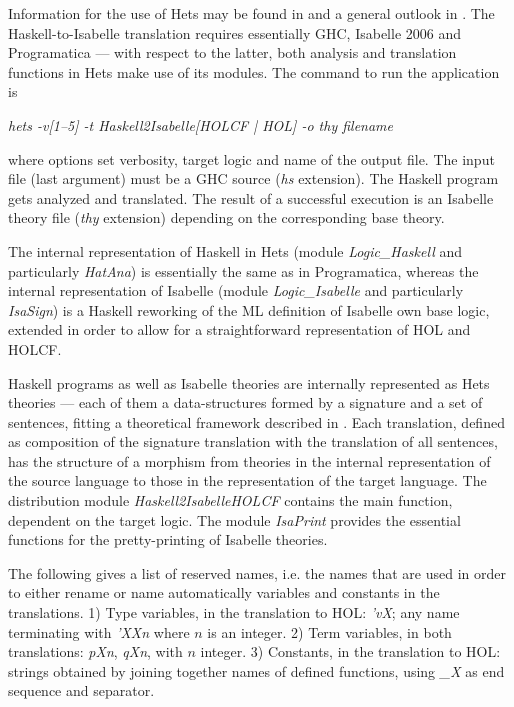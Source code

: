 \documentclass{llncs}
\begin{document}
Information for the use of Hets may be found in \cite{HetsUG} and a
general outlook in \cite{HetsUG}. The Haskell-to-Isabelle translation
requires essentially GHC, Isabelle 2006 and Programatica --- with
respect to the latter, both analysis and translation functions in Hets
make use of its modules.  The command to run the application is

\emph{hets -v[1--5] -t Haskell2Isabelle[HOLCF | HOL] -o thy filename}

\noindent where options set verbosity, target logic and name of the
output file. The input file (last argument) must be a GHC source
(\emph{hs} extension).  The Haskell program gets analyzed and
translated. The result of a successful execution is an Isabelle theory
file (\emph{thy} extension) depending on the corresponding base
theory.


The internal representation of Haskell in Hets (module
\emph{Logic\_Haskell} and particularly \emph{HatAna}) is essentially
the same as in Programatica, whereas the internal representation of
Isabelle (module \emph{Logic\_Isabelle} and particularly
\emph{IsaSign}) is a Haskell reworking of the ML definition of
Isabelle own base logic, extended in order to allow for a
straightforward representation of HOL and HOLCF.

Haskell programs as well as Isabelle theories are internally
represented as Hets theories --- each of them a data-structures formed
by a signature and a set of sentences, fitting a theoretical framework
described in \cite{MossaTh}.  Each translation, defined as composition
of the signature translation with the translation of all sentences,
has the structure of a morphism from theories in the internal
representation of the source language to those in the representation
of the target language.  The distribution module
\emph{Haskell2IsabelleHOLCF} contains the main function, dependent on
the target logic. The module \emph{IsaPrint} provides the essential
functions for the pretty-printing of Isabelle theories.

The following gives a list of reserved names, i.e. the names that are
used in order to either rename or name automatically variables and
constants in the translations.  1) Type variables, in the translation
to HOL: \emph{'vX}; any name terminating with \emph{'XXn} where $n$ is
an integer.  2) Term variables, in both translations: \emph{pXn},
\emph{qXn}, with $n$ integer. 3) Constants, in the translation to HOL:
strings obtained by joining together names of defined functions, using
\emph{\_X} as end sequence and separator.
\end{document}
